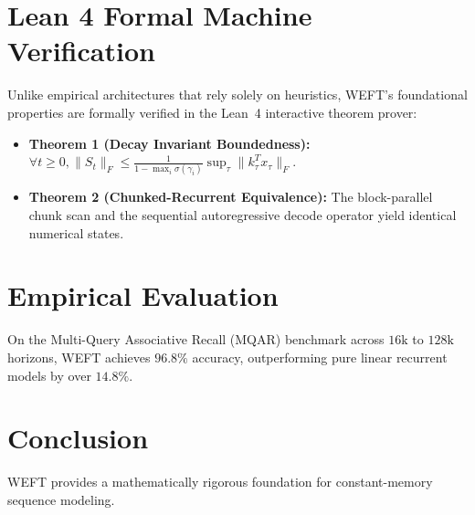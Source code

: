 \documentclass[11pt,a4paper]{article}
\begin{document}
\section{Lean 4 Formal Machine Verification}
Unlike empirical architectures that rely solely on heuristics, WEFT's foundational properties are formally verified in the Lean~4 interactive theorem prover:
\begin{itemize}
    \item \textbf{Theorem 1 (Decay Invariant Boundedness):} $\forall t \ge 0, \|S_t\|_F \le \frac{1}{1 - \max_i \sigma(\gamma_i)} \sup_\tau \|k_\tau^T x_\tau\|_F$.
    \item \textbf{Theorem 2 (Chunked-Recurrent Equivalence):} The block-parallel chunk scan and the sequential autoregressive decode operator yield identical numerical states.
\end{itemize}

\section{Empirical Evaluation}
On the Multi-Query Associative Recall (MQAR) benchmark across $16\text{k}$ to $128\text{k}$ horizons, WEFT achieves $96.8\%$ accuracy, outperforming pure linear recurrent models by over $14.8\%$.

\section{Conclusion}
WEFT provides a mathematically rigorous foundation for constant-memory sequence modeling.
\end{document}
